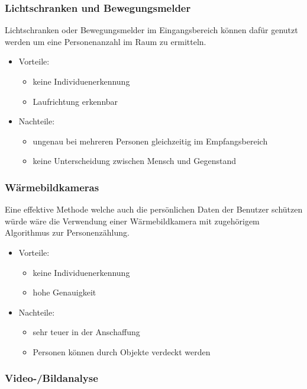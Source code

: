 \subsubsection{Lichtschranken und Bewegungsmelder}
\label{sec:Lichtschranken_und_Bewegungsmelder}

Lichtschranken oder Bewegungsmelder im Eingangsbereich können dafür genutzt
werden um eine Personenanzahl im Raum zu ermitteln.

\begin{itemize}
	\item Vorteile:
	\begin{itemize}
		\item keine Individuenerkennung
		\item Laufrichtung erkennbar
	\end{itemize}
	\item Nachteile:
	\begin{itemize}
		\item ungenau bei mehreren Personen gleichzeitig im Empfangsbereich
		\item keine Unterscheidung zwischen Mensch und Gegenstand
	\end{itemize}
\end{itemize}


\subsubsection{Wärmebildkameras}
\label{Wärmebildkameras}

Eine effektive Methode welche auch die persönlichen Daten der Benutzer
schützen würde wäre die Verwendung einer Wärmebildkamera mit zugehörigem
Algorithmus zur Personenzählung.

\begin{itemize}
	\item Vorteile:
	\begin{itemize}
		\item keine Individuenerkennung
		\item hohe Genauigkeit
	\end{itemize}
	\item Nachteile:
	\begin{itemize}
		\item sehr teuer in der Anschaffung
		\item Personen können durch Objekte verdeckt werden
	\end{itemize}
\end{itemize}

\subsubsection{ Video-/Bildanalyse}
\label{sec:Video_Bildanalyse}

